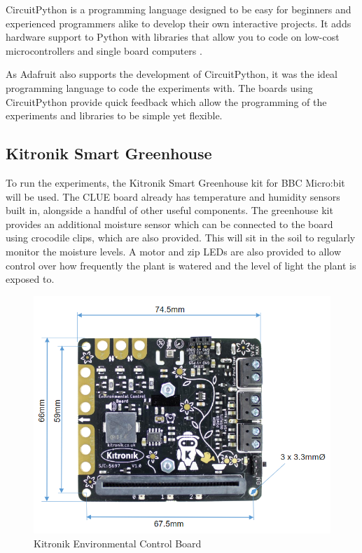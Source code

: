 CircuitPython is a programming language designed to be easy for beginners and experienced programmers alike to develop their own interactive projects. It adds hardware support to Python with libraries that allow you to code on low-cost microcontrollers and single board computers \cite{circuitpython}.

As Adafruit also supports the development of CircuitPython, it was the ideal programming language to code the experiments with. The boards using CircuitPython provide quick feedback which allow the programming of the experiments and libraries to be simple yet flexible.

\subsection{Kitronik Smart Greenhouse}

To run the experiments, the Kitronik Smart Greenhouse kit for BBC Micro:bit will be used. The CLUE board already has temperature and humidity sensors built in, alongside a handful of other useful components. The greenhouse kit provides an additional moisture sensor which can be connected to the board using crocodile clips, which are also provided. This will sit in the soil to regularly monitor the moisture levels. A motor and zip LEDs are also provided to allow control over how frequently the plant is watered and the level of light the plant is exposed to.

\begin{figure}[ht]
    \centering
    \includegraphics[scale=0.6]{Report/Images/KitronikBoard.png}
    \caption{Kitronik Environmental Control Board \cite{kitronikBoard}}
    \label{fig:KitronikBoard}
\end{figure}

